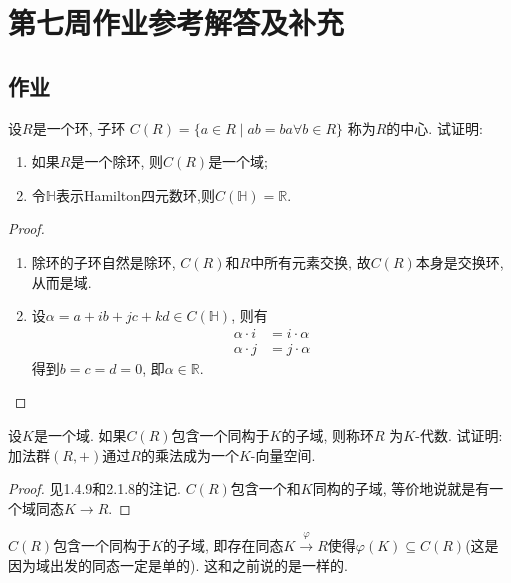 \documentclass{../solutions-cn}
\begin{document}
\section*{第七周作业参考解答及补充}

\subsection*{作业}

\begin{exercise}[习题2.1.11]
    设$R$是一个环, 子环
$C(R) = \{a \in R \mid ab = ba \forall b \in R\}$
称为$R$的中心. 试证明:
\begin{enumerate}[(1)]
    \item 如果$R$是一个除环, 则$C(R)$是一个域;
    \item 令$\mathbb{H}$表示Hamilton四元数环,则$C(\mathbb{H}) = \mathbb{R}$.
\end{enumerate}
\end{exercise}

\begin{proof}
    \begin{enumerate}[(1)]
        \item 除环的子环自然是除环, $C(R)$和$R$中所有元素交换, 故$C(R)$本身是交换环, 从而是域.
        \item 设$\alpha = a + ib + jc + kd \in C(\mathbb{H})$, 则有
        \[
        \begin{aligned}
            \alpha \cdot i &= i \cdot \alpha\\
            \alpha \cdot j &= j \cdot \alpha
        \end{aligned}
        \]
        得到$b = c = d = 0$, 即$\alpha \in \mathbb{R}$.
    \end{enumerate}
\end{proof}

\begin{exercise}[习题2.1.12]
    设$K$是一个域. 如果$C(R)$包含一个同构于$K$的子域, 则称环$R$
为$K$-代数. 试证明: 加法群$(R, +)$通过$R$的乘法成为一个$K$-向量空间.
\end{exercise}

\begin{proof}
    见1.4.9和2.1.8的注记. $C(R)$包含一个和$K$同构的子域, 等价地说就是有一个域同态$K \to R$.
\end{proof}

\begin{remark}
    $C(R)$包含一个同构于$K$的子域, 即存在同态$K \overset{\varphi}\to R$使得$\varphi(K) \subseteq C(R)$(这是因为域出发的同态一定是单的). 这和之前说的是一样的.
\end{remark}
\end{document}
